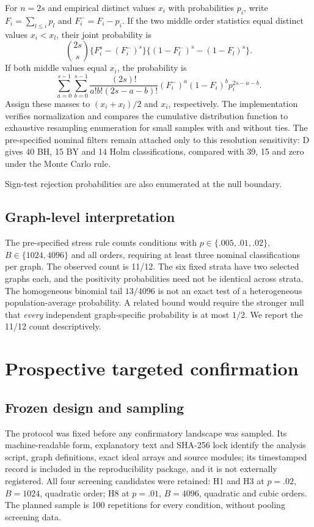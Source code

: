 For $n=2s$ and empirical distinct values $x_i$ with probabilities $p_i$, write $F_i=\sum_{l\le i}p_l$ and $F_i^-=F_i-p_i$. If the two middle order statistics equal distinct values $x_i<x_l$, their joint probability is
\[
 {2s\choose s}\{F_i^s-(F_i^-)^s\}
 \{(1-F_l^-)^s-(1-F_l)^s\}.
\]
If both middle values equal $x_i$, the probability is
\[
 \sum_{a=0}^{s-1}\sum_{b=0}^{s-1}
 \frac{(2s)!}{a!b!(2s-a-b)!}
 (F_i^-)^a(1-F_i)^b p_i^{2s-a-b}.
\]
Assign these masses to $(x_i+x_l)/2$ and $x_i$, respectively. The implementation verifies normalization and compares the cumulative distribution function to exhaustive resampling enumeration for small samples with and without ties. The pre-specified nominal filters remain attached only to this resolution sensitivity: D gives 40 BH, 15 BY and 14 Holm classifications, compared with 39, 15 and zero under the Monte Carlo rule.

Sign-test rejection probabilities are also enumerated at the null boundary.

\subsection{Graph-level interpretation}
The pre-specified stress rule counts conditions with $p\in\{.005,.01,.02\}$, $B\in\{1024,4096\}$ and all orders, requiring at least three nominal classifications per graph. The observed count is 11/12. The six fixed strata have two selected graphs each, and the positivity probabilities need not be identical across strata. The homogeneous binomial tail $13/4096$ is not an exact test of a heterogeneous population-average probability. A related bound would require the stronger null that \emph{every} independent graph-specific probability is at most $1/2$. We report the 11/12 count descriptively.

\section{Prospective targeted confirmation}\label{app:confirmation}
\subsection{Frozen design and sampling}
The protocol was fixed before any confirmatory landscape was sampled. Its machine-readable form, explanatory text and SHA-256 lock identify the analysis script, graph definitions, exact ideal arrays and source modules; its timestamped record is included in the reproducibility package, and it is not externally registered. All four screening candidates were retained: H1 and H3 at $p=.02$, $B=1024$, quadratic order; H8 at $p=.01$, $B=4096$, quadratic and cubic orders. The planned sample is 100 repetitions for every condition, without pooling screening data.

